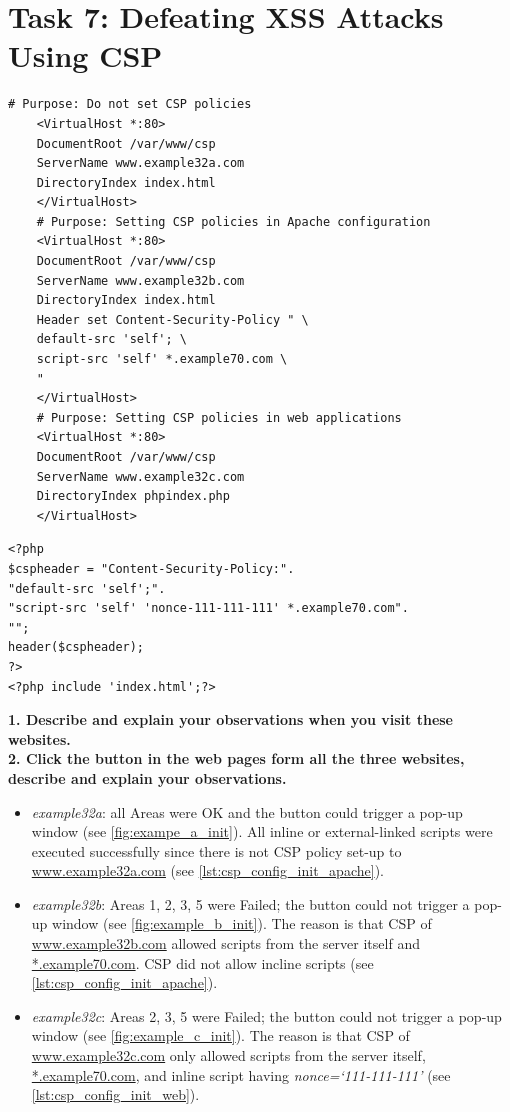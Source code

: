 \section{Task 7: Defeating XSS Attacks Using CSP}
%

\begin{lstlisting}[caption=Inital CSP configuration by Apache.,
    label={lst:csp_config_init_apache}]
    # Purpose: Do not set CSP policies
    <VirtualHost *:80>
    DocumentRoot /var/www/csp
    ServerName www.example32a.com
    DirectoryIndex index.html
    </VirtualHost>
    # Purpose: Setting CSP policies in Apache configuration
    <VirtualHost *:80>
    DocumentRoot /var/www/csp
    ServerName www.example32b.com
    DirectoryIndex index.html
    Header set Content-Security-Policy " \
    default-src 'self'; \
    script-src 'self' *.example70.com \
    "
    </VirtualHost>
    # Purpose: Setting CSP policies in web applications
    <VirtualHost *:80>
    DocumentRoot /var/www/csp
    ServerName www.example32c.com
    DirectoryIndex phpindex.php
    </VirtualHost>    
\end{lstlisting}

\begin{lstlisting}[caption=Inital CSP configuration by web application,
    label={lst:csp_config_init_web}]
<?php
$cspheader = "Content-Security-Policy:".
"default-src 'self';".
"script-src 'self' 'nonce-111-111-111' *.example70.com".
"";
header($cspheader);
?>
<?php include 'index.html';?>
\end{lstlisting}

\textbf{1. Describe and explain your observations when you visit these websites.}\\
\textbf{2. Click the button in the web pages form all the three websites, describe and
explain your observations.}

\begin{itemize}
    \item \emph{example32a}: all Areas were OK and the button could trigger a pop-up window
    (see \autoref{fig:exampe_a_init}). All inline or external-linked scripts were executed
    successfully since there is not CSP policy set-up to \url{www.example32a.com}
    (see \autoref{lst:csp_config_init_apache}).
    \item \emph{example32b}: Areas 1, 2, 3, 5 were Failed; the button could not trigger a
    pop-up window (see \autoref{fig:example_b_init}). The reason is that CSP of \url{www.example32b.com} allowed scripts from
    the server itself and \url{*.example70.com}. CSP did not allow incline scripts
    (see \autoref{lst:csp_config_init_apache}).
    \item \emph{example32c}: Areas 2, 3, 5 were Failed; the button could not trigger a
    pop-up window (see \autoref{fig:example_c_init}). The reason is that CSP of
    \url{www.example32c.com} only allowed scripts from the server itself, \url{*.example70.com},
    and inline script having \emph{nonce=`111-111-111'} (see \autoref{lst:csp_config_init_web}).
\end{itemize}


